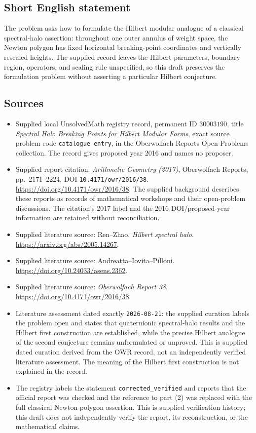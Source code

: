 \documentclass[11pt]{article}
\begin{document}
\subsection{Short English statement}
The problem asks how to formulate the Hilbert modular analogue of a classical spectral-halo assertion: throughout one outer annulus of weight space, the Newton polygon has fixed horizontal breaking-point coordinates and vertically rescaled heights. The supplied record leaves the Hilbert parameters, boundary region, operators, and scaling rule unspecified, so this draft preserves the formulation problem without asserting a particular Hilbert conjecture.
\subsection{Sources}
\begin{itemize}
\item Supplied local UnsolvedMath registry record, permanent ID \(30003190\), title \emph{Spectral Halo Breaking Points for Hilbert Modular Forms}, exact source problem code \texttt{catalogue entry}, in the Oberwolfach Reports Open Problems collection. The record gives proposed year 2016 and names no proposer.
\item Supplied report citation: \emph{Arithmetic Geometry (2017)}, Oberwolfach Reports, pp.\ 2171--2224, DOI \texttt{10.4171/owr/2016/38}. \url{https://doi.org/10.4171/owr/2016/38}. The supplied background describes these reports as records of mathematical workshops and their open-problem discussions. The citation's 2017 label and the 2016 DOI/proposed-year information are retained without reconciliation.
\item Supplied literature source: Ren--Zhao, \emph{Hilbert spectral halo}. \url{https://arxiv.org/abs/2005.14267}.
\item Supplied literature source: Andreatta--Iovita--Pilloni. \url{https://doi.org/10.24033/asens.2362}.
\item Supplied literature source: \emph{Oberwolfach Report 38}. \url{https://doi.org/10.4171/owr/2016/38}.
\item Literature assessment dated exactly \texttt{2026-08-21}: the supplied curation labels the problem open and states that quaternionic spectral-halo results and the Hilbert first construction are established, while the precise Hilbert analogue of the second conjecture remains unformulated or unproved. This is supplied dated curation derived from the OWR record, not an independently verified literature assessment. The meaning of the Hilbert first construction is not explained in the record.
\item The registry labels the statement \texttt{corrected\_verified} and reports that the official report was checked and the reference to part (2) was replaced with the full classical Newton-polygon assertion. This is supplied verification history; this draft does not independently verify the report, its reconstruction, or the mathematical claims.
\end{itemize}
\end{document}
